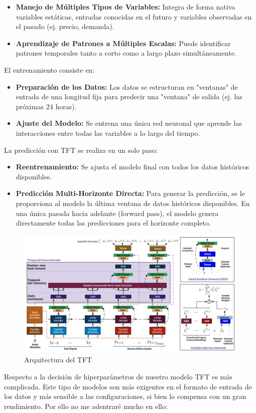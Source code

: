 \begin{itemize}
    \item \textbf{Manejo de Múltiples Tipos de Variables:} Integra de forma nativa variables estáticas, entradas conocidas en el futuro y variables observadas en el pasado (ej. precio, demanda).
    \item \textbf{Aprendizaje de Patrones a Múltiples Escalas:} Puede identificar patrones temporales tanto a corto como a largo plazo simultáneamente.
\end{itemize}
%
%
%
El entrenamiento consiste en:
%
%
%
\begin{itemize}
    \item \textbf{Preparación de los Datos:} Los datos se estructuran en "ventanas" de entrada de una longitud fija para predecir una "ventana" de salida (ej. las próximas 24 horas).
    \item \textbf{Ajuste del Modelo:} Se entrena una única red neuronal que aprende las interacciones entre todas las variables a lo largo del tiempo.
\end{itemize}
%
%
%
La predicción con TFT se realiza en un solo paso:
%
%
%
\begin{itemize}
    \item \textbf{Reentrenamiento:} Se ajusta el modelo final con todos los datos históricos disponibles.
    \item \textbf{Predicción Multi-Horizonte Directa:} Para generar la predicción, se le proporciona al modelo la última ventana de datos históricos disponibles. En una única pasada hacia adelante (forward pass), el modelo genera directamente todas las predicciones para el horizonte completo.
\end{itemize}
%
%
%
\begin{figure}[H]
    \centering
    \includegraphics[width=0.7\linewidth]{figuras/TFTarquitectura.png}
    \caption[Arquitectura de TFT]{Arquitectura del TFT \cite{TFT}}
    \label{fig:placeholder}
\end{figure}
%
%
%
Respecto a la decisión de hiperparámetros de nuestro modelo TFT es más complicada. Este tipo de modelos son más exigentes en el formato de entrada de los datos y más sensible a las configuraciones, si bien lo compensa con un gran rendimiento. Por ello no me adentraré mucho en ello:

